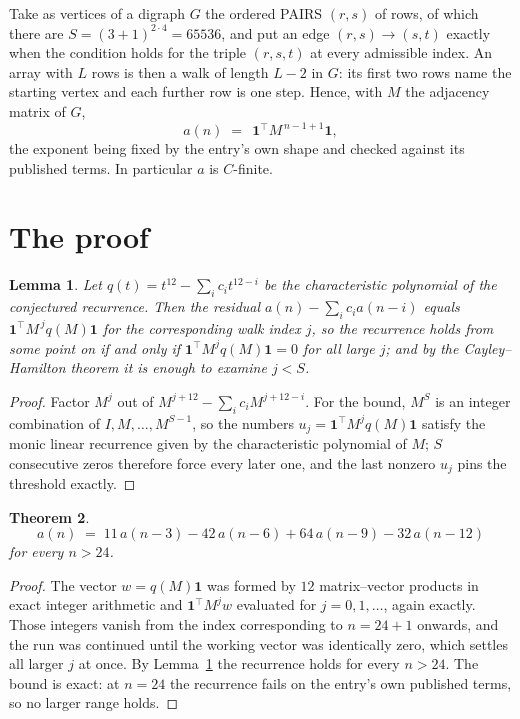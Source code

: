\documentclass[11pt,a4paper]{article}
\theoremstyle{plain}
\newtheorem{theorem}{Theorem}
\newtheorem{lemma}[theorem]{Lemma}
\theoremstyle{definition}
\begin{document}
Take as vertices of a digraph $G$ the ordered PAIRS $(r,s)$ of rows, of which there are
$S=(3+1)^{2\cdot4}=65536$, and put an edge $(r,s)\to(s,t)$ exactly when the condition
holds for the triple $(r,s,t)$ at every admissible index. An array with $L$ rows is then a
walk of length $L-2$ in $G$: its first two rows name the starting vertex and each further
row is one step. Hence, with $M$ the adjacency matrix of $G$,
\[
a(n)\;=\;\,\mathbf{1}^{\!\top}M^{\,n-1+1}\mathbf{1},
\]
the exponent being fixed by the entry's own shape and checked against its published terms.
In particular $a$ is $C$-finite.

\section{The proof}

\begin{lemma}\label{lem:crit}
Let $q(t)=t^{12}-\sum_i c_it^{12-i}$ be the characteristic polynomial of the
conjectured recurrence. Then the residual $a(n)-\sum_ic_ia(n-i)$ equals
$\mathbf{1}^{\!\top}M^{\,j}q(M)\mathbf{1}$ for the corresponding walk index
$j$, so the recurrence holds from some point on if and only if
$\mathbf{1}^{\!\top}M^{j}q(M)\mathbf{1}=0$ for all large $j$; and by the
Cayley--Hamilton theorem it is enough to examine $j<S$.
\end{lemma}

\begin{proof}
Factor $M^{j}$ out of $M^{j+12}-\sum_ic_iM^{j+12-i}$. For the bound, $M^{S}$
is an integer combination of $I,M,\dots,M^{S-1}$, so the numbers
$u_j=\mathbf{1}^{\!\top}M^{j}q(M)\mathbf{1}$ satisfy the monic linear recurrence given by
the characteristic polynomial of $M$; $S$ consecutive zeros therefore force every later one,
and the last nonzero $u_j$ pins the threshold exactly.
\end{proof}

\begin{theorem}
\[
a(n)\;=\;11\,a(n-3) - 42\,a(n-6) + 64\,a(n-9) - 32\,a(n-12)
\]
for every $n>24$.
\end{theorem}

\begin{proof}
The vector $w=q(M)\mathbf{1}$ was formed by $12$ matrix--vector products in exact
integer arithmetic and $\mathbf{1}^{\!\top}M^{j}w$ evaluated for $j=0,1,\dots$, again
exactly. Those integers vanish from the index corresponding to $n=24+1$ onwards, and the
run was continued until the working vector was identically zero, which settles all larger $j$
at once. By Lemma~\ref{lem:crit} the recurrence holds for every $n>24$. The bound is exact: at $n=24$ the recurrence fails on the entry's own published terms, so no larger range holds.
\end{proof}
\end{document}
